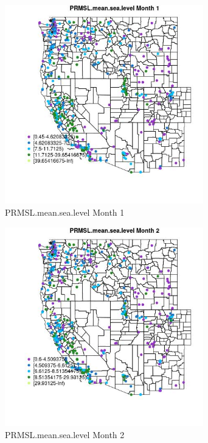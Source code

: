 \begin{figure} 
\centering  
\includegraphics[width=0.77\textwidth]{Code_Outputs/ML_input_report_ML_input_PM25_Step5_part_d_de_duplicated_aves_ML_input_MapObsMo1PRMSLmeansealevel.jpg} 
\caption{\label{fig:ML_input_report_ML_input_PM25_Step5_part_d_de_duplicated_aves_ML_inputMapObsMo1PRMSLmeansealevel}PRMSL.mean.sea.level Month 1} 
\end{figure} 
 

\clearpage 

\begin{figure} 
\centering  
\includegraphics[width=0.77\textwidth]{Code_Outputs/ML_input_report_ML_input_PM25_Step5_part_d_de_duplicated_aves_ML_input_MapObsMo2PRMSLmeansealevel.jpg} 
\caption{\label{fig:ML_input_report_ML_input_PM25_Step5_part_d_de_duplicated_aves_ML_inputMapObsMo2PRMSLmeansealevel}PRMSL.mean.sea.level Month 2} 
\end{figure} 
 

